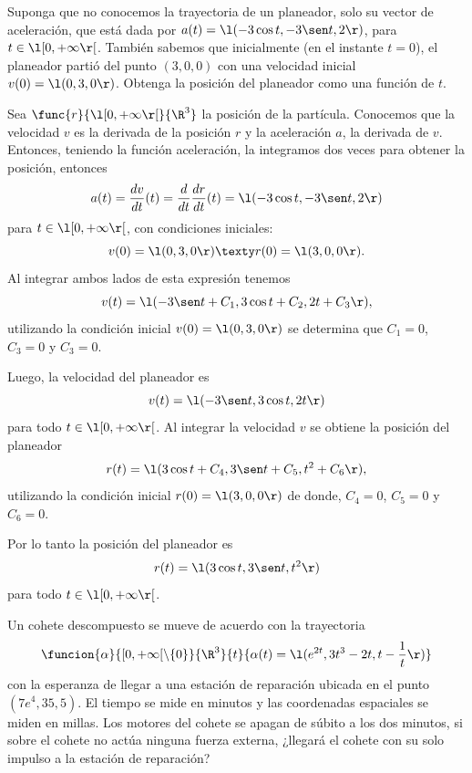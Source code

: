 \documentclass[a4,11pt]{aleph-examen}
\begin{document}
\begin{preguntas}

\item
Suponga que no conocemos la trayectoria de un planeador, solo su vector de
aceleración, que está dada por $a(t)= \l(-3 \cos t, -3 \sen t, 2 \r)$, para $t\in \l[0,+\infty\r[$. También sabemos que inicialmente
(en el instante $t=0$), el planeador partió del punto $(3, 0, 0)$ con una velocidad inicial $v(0)=\l(0,3,0\r)$. Obtenga la posición del planeador como una función de $t$.
    
\begin{respuesta}
    Sea $\func{r}{\l[0,+\infty\r[}{\R^3}$ la posición de la partícula. Conocemos que la velocidad $v$ es la derivada de la posición $r$ y la aceleración $a$, la derivada de $v$. Entonces, teniendo la función aceleración, la integramos dos veces para obtener la posición, entonces
    \[
        a(t)=\dfrac{dv}{dt}(t)=\dfrac{d}{dt}\dfrac{dr}{dt}(t)= \l(-3 \cos t, -3 \sen t, 2 \r)
    \]
    para $t\in\l[0,+\infty\r[$, con condiciones iniciales:
    \[
        v(0)= \l(0,3,0\r)
        \texty
        r(0)= \l(3,0,0\r).
    \]
    Al integrar ambos lados de esta expresión tenemos
    \[
        v(t)= \l(-3 \sen t+C_1, 3 \cos t+C_2, 2t +C_3 \r),
    \]
    utilizando la condición inicial $v(0)= \l(0,3,0\r)$ se determina que $C_1=0$, $C_3=0$ y $C_3=0$.

    Luego, la velocidad del planeador es
    \[
        v(t)= \l(-3 \sen t, 3 \cos t, 2t \r)
    \]
    para todo $t\in\l[0,+\infty\r[$. Al integrar la velocidad $v$ se obtiene la posición del planeador
    \[
        r(t)= \l(3 \cos t + C_4, 3 \sen t + C_5, t^2 + C_6 \r),
    \]
    utilizando la condición inicial $r(0)= \l(3,0,0\r)$ de donde, $C_4=0$, $C_5=0$ y $C_6=0$.

    Por lo tanto la posición del planeador es
    \[
        r(t)= \l(3 \cos t, 3 \sen t, t^2\r)
    \]
    para todo $t\in\l[0,+\infty\r[$.
\end{respuesta}

\item Un cohete descompuesto se mueve de acuerdo con la trayectoria
\[
\funcion{\alpha}{[0,+\infty[\setminus \lbrace 0 \rbrace}{\R^3}
{t}{\alpha(t)=\l(e^{2t},3t^3-2t,t-\dfrac{1}{t}\r)}
\]
con la esperanza de llegar a una estación de reparación ubicada en el punto $(7e^4,35,5)$. El tiempo se mide en minutos y las coordenadas espaciales se miden en millas. Los motores del cohete se apagan de súbito a los dos minutos, si sobre el cohete no actúa ninguna fuerza externa, ¿llegará el cohete con su solo impulso a la estación de reparación?


\end{preguntas}
\end{document}
